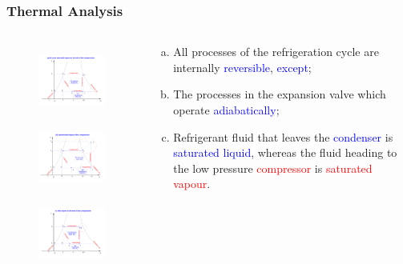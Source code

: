 \documentclass[10pt,compress,handout,ignorenonframetext]{beamer}
\begin{document}
\begin{frame}
 \frametitle{Thermal Analysis}
 \begin{columns}
  \begin{column}[c]{0.55\linewidth}
   \begin{figure}%
     \vbox{
      \includegraphics[width=4.cm,height=2.4cm,clip]{./Pics/Overview_Refrig14}
      \vspace{-.1cm}
      \includegraphics[width=4.cm,height=2.4cm,clip]{./Pics/Overview_Refrig15}
      \vspace{-.1cm}
      \includegraphics[width=4.cm,height=2.4cm,clip]{./Pics/Overview_Refrig16}}
   \end{figure}  
  \end{column}  
  \begin{column}[c]{0.45\linewidth}
   \begin{enumerate}[(a)]
    \item <1-> All processes of the refrigeration cycle are internally \textcolor{blue}{reversible}, \textcolor{blue}{except}; 
    \item <2-> The processes in the expansion valve which operate \textcolor{blue}{adiabatically};
    \item <3-> Refrigerant fluid that leaves the \textcolor{blue}{condenser} is \textcolor{blue}{saturated liquid}, whereas the fluid heading to the low pressure \textcolor{red}{compressor} is \textcolor{red}{saturated vapour}.
   \end{enumerate}
  \end{column}  
 \end{columns}
\end{frame}
\end{document}
